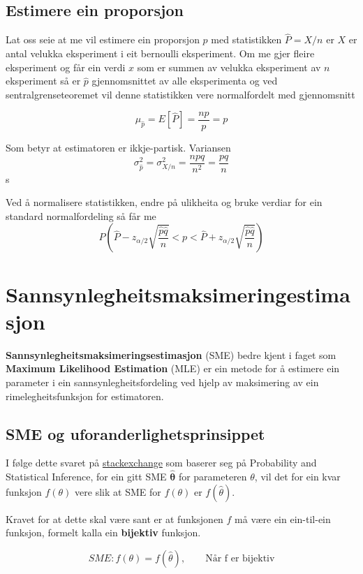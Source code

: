 \subsection{Estimere ein proporsjon}
Lat oss seie at me vil estimere ein proporsjon $p$ med statistikken $\hat{P} = X/n$ er $X$ er antal velukka eksperiment i eit bernoulli eksperiment. Om me gjer fleire eksperiment og får ein verdi $x$ som er summen av velukka eksperiment av $n$ eksperiment så er $\hat{p}$ gjennomsnittet av alle eksperimenta og ved sentralgrenseteoremet vil denne statistikken vere normalfordelt med gjennomsnitt

\begin{equation}
    \mu_{\hat{p}} = E[\hat{P}] = \frac{np}{p} = p
\end{equation}

Som betyr at estimatoren er ikkje-partisk. Variansen
\begin{equation}
    \sigma^2_{\hat{p}} = \sigma^2_{X/n} = \frac{npq}{n^2} = \frac{pq}{n}
\end{equation}s

Ved å normalisere statistikken, endre på ulikheita og bruke verdiar for ein standard normalfordeling så får me
\begin{equation}
    P\left( \hat{P}-z_{\alpha/2}\sqrt{\frac{\hat{p}\hat{q}}{n}} < p < \hat{P} + z_{\alpha/2}\sqrt{\frac{\hat{p}\hat{q}}{n}} \right)
\end{equation}

\section{Sannsynlegheitsmaksimeringestimasjon}
\textbf{Sannsynlegheitsmaksimeringsestimasjon} (SME) bedre kjent i faget som \textbf{Maximum Likelihood Estimation} (MLE) er ein metode for å estimere ein parameter i ein sannsynlegheitsfordeling ved hjelp av maksimering av ein rimelegheitsfunksjon for estimatoren.

\subsection{SME og uforanderlighetsprinsippet}
I følge dette svaret på \href{https://stats.stackexchange.com/questions/77573/invariance-property-of-mle-what-is-the-mle-of-theta2-of-normal-barx2}{stackexchange} som baserer seg på Probability and Statistical Inference\cite{mukhopadhyay2020probability}, for ein gitt SME $\boldsymbol{\hat{\theta}}$ for parameteren $\theta$, vil det for ein kvar funksjon $f(\theta)$ vere slik at SME for $f(\theta)$ er $f(\hat{\theta})$.

Kravet for at dette skal være sant er at funksjonen $f$ må være ein ein-til-ein funksjon, formelt kalla ein \textbf{bijektiv} funksjon.

\begin{equation}
    SME: f(\theta) = f(\hat{\theta}), \qquad \text{Når f er bijektiv}
\end{equation}